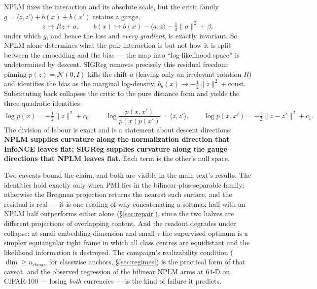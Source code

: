 \documentclass{article}
\newcommand{\N}{\mathcal{N}}
\begin{document}
NPLM fixes the interaction and its absolute scale, but the critic family
$g = \langle z,z'\rangle + b(x) + b(x')$ retains a gauge,
\begin{equation}
z \mapsto Rz + a, \qquad
b(x) \mapsto b(x) - \langle a, z\rangle - \tfrac12\|a\|^2 + \beta ,
\end{equation}
under which $g$, and hence the loss and \emph{every gradient}, is exactly
invariant. So NPLM alone determines what the pair interaction is but not how it
is split between the embedding and the bias --- the map into ``log-likelihood
space'' is undetermined by descent. SIGReg removes precisely this residual
freedom: pinning $p(z)=\N(0,I)$ kills the shift $a$ (leaving only an irrelevant
rotation $R$) and identifies the bias as the marginal log-density,
$b_\theta(x)\to-\tfrac12\|z\|^2+\text{const}$. Substituting back collapses the
critic to the pure distance form and yields the three quadratic identities
\begin{equation}
\log p(x) = -\tfrac12\|z\|^2 + c_0,
\qquad
\log\frac{p(x,x')}{p(x)p(x')} = \langle z,z'\rangle,
\qquad
\log p(x,x') = -\tfrac12\|z-z'\|^2 + c_1 .
\end{equation}
The division of labour is exact and is a statement about descent directions:
\textbf{NPLM supplies curvature along the normalization direction that InfoNCE
leaves flat; SIGReg supplies curvature along the gauge directions that NPLM
leaves flat.} Each term is the other's null space.

Two caveats bound the claim, and both are visible in the main text's results.
The identities hold exactly only when $\mathrm{PMI}$ lies in the
bilinear-plus-separable family; otherwise the Bregman projection returns the
nearest such surface, and the residual is real --- it is one reading of why
concatenating a softmax half with an NPLM half outperforms either alone
(\S\ref{sec:repair}), since the two halves are different projections of
overlapping content. And the readout degrades under collapse: at small
embedding dimension and small $\tau$ the supervised optimum is a simplex
equiangular tight frame in which all class centres are equidistant and the
likelihood information is destroyed. The campaign's realizability condition
($\dim \ge n_{\text{classes}}$ for classwise anchors, \S\ref{sec:regimes}) is
the practical form of that caveat, and the observed regression of the bilinear
NPLM arms at 64-D on CIFAR-100 --- losing \emph{both} currencies --- is the
kind of failure it predicts.


\end{document}
